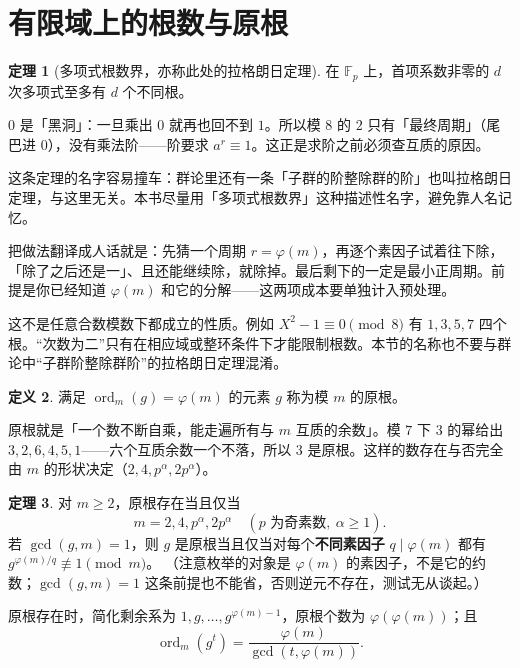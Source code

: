 \documentclass[UTF8,a4paper,11pt,twoside,openright,fontset=fandol]{ctexbook}
\theoremstyle{definition}
\newtheorem{definition}{定义}[chapter]
\newtheorem{theorem}[definition]{定理}
\newcommand{\ord}{\operatorname{ord}}
\begin{document}
\section{有限域上的根数与原根}
\begin{theorem}[多项式根数界，亦称此处的拉格朗日定理]
在 $\mathbb F_p$ 上，首项系数非零的 $d$ 次多项式至多有 $d$ 个不同根。
\end{theorem}
\begin{tip}[图景：$0$ 是黑洞]
$0$ 是「黑洞」：一旦乘出 $0$ 就再也回不到 $1$。所以模 $8$ 的 $2$ 只有「最终周期」（尾巴进 $0$），没有乘法阶——阶要求 $a^r\equiv1$。这正是求阶之前必须查互质的原因。
\end{tip}


\begin{tip}
这条定理的名字容易撞车：群论里还有一条「子群的阶整除群的阶」也叫拉格朗日定理，与这里无关。本书尽量用「多项式根数界」这种描述性名字，避免靠人名记忆。
\end{tip}


\begin{tip}
把做法翻译成人话就是：先猜一个周期 $r=\varphi(m)$，再逐个素因子试着往下除，「除了之后还是一」、且还能继续除，就除掉。最后剩下的一定是最小正周期。前提是你已经知道 $\varphi(m)$ 和它的分解——这两项成本要单独计入预处理。
\end{tip}


\begin{pitfall}
这不是任意合数模数下都成立的性质。例如 $X^2-1\equiv0\pmod8$ 有 $1,3,5,7$ 四个根。“次数为二”只有在相应域或整环条件下才能限制根数。本节的名称也不要与群论中“子群阶整除群阶”的拉格朗日定理混淆。
\end{pitfall}


\begin{definition}
满足 $\ord_m(g)=\varphi(m)$ 的元素 $g$ 称为模 $m$ 的原根。
\end{definition}

\begin{tip}[原根一句话]
原根就是「一个数不断自乘，能走遍所有与 $m$ 互质的余数」。模 $7$ 下 $3$ 的幂给出 $3,2,6,4,5,1$——六个互质余数一个不落，所以 $3$ 是原根。这样的数存在与否完全由 $m$ 的形状决定（$2,4,p^\alpha,2p^\alpha$）。
\end{tip}

\begin{theorem}
对 $m\ge2$，原根存在当且仅当
\[
 m=2,4,p^\alpha,2p^\alpha\quad(p\text{ 为奇素数},\ \alpha\ge1).
\]
若 $\gcd(g,m)=1$，则 $g$ 是原根当且仅当对每个\textbf{不同素因子} $q\mid\varphi(m)$ 都有 $g^{\varphi(m)/q}\not\equiv1\pmod m$。
（注意枚举的对象是 $\varphi(m)$ 的素因子，不是它的约数；$\gcd(g,m)=1$ 这条前提也不能省，否则逆元不存在，测试无从谈起。）
\end{theorem}
原根存在时，简化剩余系为 $1,g,\ldots,g^{\varphi(m)-1}$，原根个数为 $\varphi(\varphi(m))$；且
\[
 \ord_m(g^t)=\frac{\varphi(m)}{\gcd(t,\varphi(m))}.
\]
\end{document}

